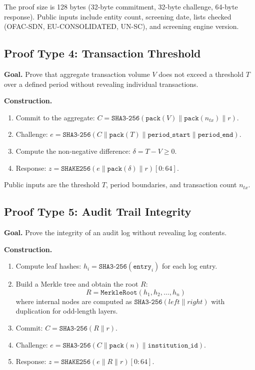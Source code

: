 \documentclass[conference,10pt]{IEEEtran}
\newcommand{\SHAKE}{\texttt{SHAKE256}}
\newcommand{\SHA}{\texttt{SHA3-256}}
\begin{document}
The proof size is 128 bytes (32-byte commitment, 32-byte challenge, 64-byte response). Public inputs include entity count, screening date, lists checked (OFAC-SDN, EU-CONSOLIDATED, UN-SC), and screening engine version.

\subsection{Proof Type 4: Transaction Threshold}

\textbf{Goal.} Prove that aggregate transaction volume $V$ does not exceed a threshold $T$ over a defined period without revealing individual transactions.

\textbf{Construction.}
\begin{enumerate}
\item Commit to the aggregate: $C = \SHA(\texttt{pack}(V) \| \texttt{pack}(n_{tx}) \| r)$.
\item Challenge: $e = \SHA(C \| \texttt{pack}(T) \| \texttt{period\_start} \| \texttt{period\_end})$.
\item Compute the non-negative difference: $\delta = T - V \geq 0$.
\item Response: $z = \SHAKE(e \| \texttt{pack}(\delta) \| r)[0{:}64]$.
\end{enumerate}

Public inputs are the threshold $T$, period boundaries, and transaction count $n_{tx}$.

\subsection{Proof Type 5: Audit Trail Integrity}

\textbf{Goal.} Prove the integrity of an audit log without revealing log contents.

\textbf{Construction.}
\begin{enumerate}
\item Compute leaf hashes: $h_i = \SHA(\texttt{entry}_i)$ for each log entry.
\item Build a Merkle tree and obtain the root $R$:
\begin{equation}
R = \texttt{MerkleRoot}(h_1, h_2, \ldots, h_n)
\end{equation}
where internal nodes are computed as $\SHA(left \| right)$ with duplication for odd-length layers.
\item Commit: $C = \SHA(R \| r)$.
\item Challenge: $e = \SHA(C \| \texttt{pack}(n) \| \texttt{institution\_id})$.
\item Response: $z = \SHAKE(e \| R \| r)[0{:}64]$.
\end{enumerate}
\end{document}
